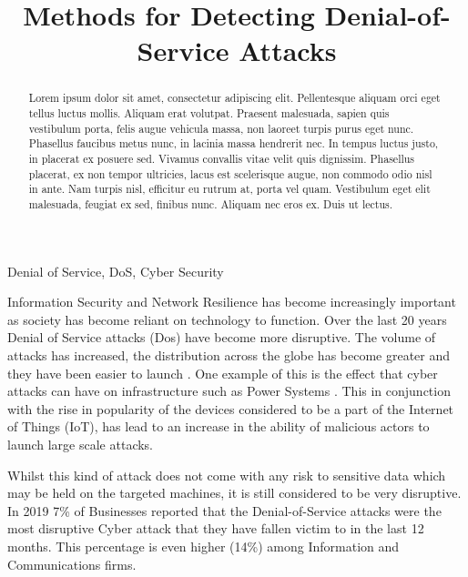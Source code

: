 \documentclass[conference, a4paper]{IEEEtran}
\begin{document}
\title{Methods for Detecting Denial-of-Service Attacks\\
}

\author{
}

\maketitle

\begin{abstract}
    Lorem ipsum dolor sit amet, consectetur adipiscing elit. Pellentesque aliquam orci eget tellus luctus mollis. Aliquam erat volutpat. Praesent malesuada, sapien quis vestibulum porta, felis augue vehicula massa, non laoreet turpis purus eget nunc. Phasellus faucibus metus nunc, in lacinia massa hendrerit nec. In tempus luctus justo, in placerat ex posuere sed. Vivamus convallis vitae velit quis dignissim. Phasellus placerat, ex non tempor ultricies, lacus est scelerisque augue, non commodo odio nisl in ante. Nam turpis nisl, efficitur eu rutrum at, porta vel quam. Vestibulum eget elit malesuada, feugiat ex sed, finibus nunc. Aliquam nec eros ex. Duis ut lectus.
    \newline
\end{abstract}

\begin{IEEEkeywords}
    Denial of Service, DoS, Cyber Security
\end{IEEEkeywords}

    Information Security and Network Resilience has become increasingly important as society has become reliant on technology to function.
    Over the last 20 years Denial of Service attacks (Dos) have become more disruptive. The volume of attacks has increased, the distribution across the globe has become greater and they have been easier to launch \cite{20_years_of_DDOS}.
    One example of this is the effect that cyber attacks can have on infrastructure such as Power Systems \cite{DDOS_power_systems}. 
    This in conjunction with the rise in popularity of the devices considered to be a part of the Internet of Things (IoT), has lead to an increase in the ability of malicious actors to launch large scale attacks.

    Whilst this kind of attack does not come with any risk to sensitive data which may be held on the targeted machines, it is still considered to be very disruptive.
    In 2019 7\% of Businesses reported that the Denial-of-Service attacks were the most disruptive Cyber attack that they have fallen victim to in the last 12 months.
    This percentage is even higher (14\%) among Information and Communications firms.\cite{government_security_survey}
\end{document}
